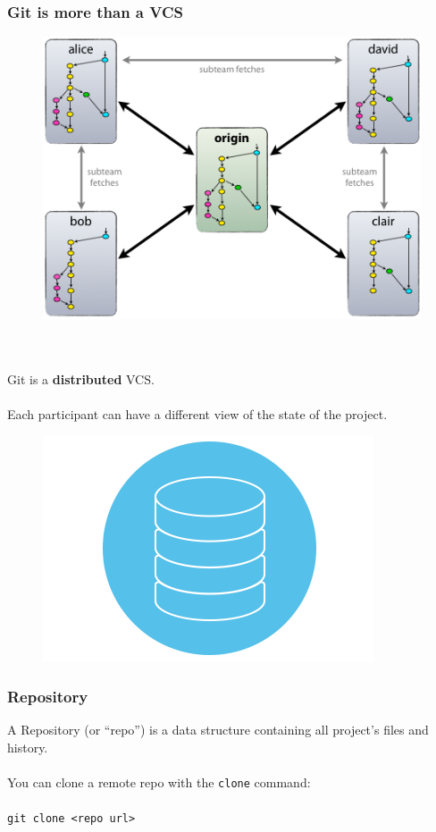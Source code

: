 \documentclass{beamer}
\begin{document}
\begin{frame}
    \frametitle{Git is more than a VCS}
    \begin{figure}
        \includegraphics[scale=0.3]{imgs/git-distributed.png}
    \end{figure}
    \hfill \\\hfill \\
    Git is a \textbf{distributed} VCS.\\
    \hfill \\
    Each participant can have a different view of the state of the project.\\
\end{frame}

\begin{frame}[fragile]
    \begin{figure}
        \includegraphics[scale=0.3]{imgs/repo.png}
    \end{figure}
    \frametitle{Repository}
    A Repository (or ``repo'') is a data structure containing all project's files and history.\\
    \hfill \\
    You can clone a remote repo with the \texttt{clone} command:
    \hfill \\ \hfill \\
    \texttt{git clone <repo url>}
\end{frame}
\end{document}
